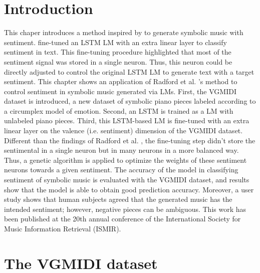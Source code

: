 \section{Introduction}

This chaper introduces a method inspired by \citet{radford_2017} to generate symbolic music with sentiment. \citet{radford_2017} fine-tuned an LSTM LM with an extra linear layer to classify sentiment in text. This fine-tuning procedure highlighted that most of the sentiment signal was stored in a single neuron. Thus, this neuron could be directly adjusted to control the original LSTM LM to generate text with a target sentiment. This chapter shows an application of Radford et al. \cite{radford_2017}'s method to control sentiment in symbolic music generated via LMs. First, the VGMIDI dataset is introduced, a new dataset of symbolic piano pieces labeled according to a circumplex model of emotion. Second, an LSTM is trained as a LM with unlabeled piano pieces. Third, this LSTM-based LM is fine-tuned with an extra linear layer on the valence (i.e. sentiment) dimension of the VGMIDI dataset. Different than the findings of Radford et al. \cite{radford_2017}, the fine-tuning step didn't store the sentimental in a single neuron but in many neurons in a more balanced way. Thus, a genetic algorithm is applied to optimize the weights of these sentiment neurons towards a given sentiment. The accuracy of the model in classifying sentiment of symbolic music is evaluated with the VGMIDI dataset, and results show that the model is able to obtain good prediction accuracy. Moreover, a user study shows that human subjects agreed that the generated music has the intended sentiment; however, negative pieces can be ambiguous. This work has been published at the 20th annual conference of the International Society for Music Information Retrieval (ISMIR).

\section{The VGMIDI dataset}

